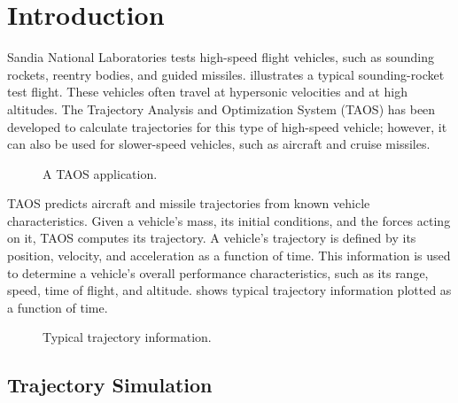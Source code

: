\chapter{Introduction}\label{chap:introduction}

Sandia National Laboratories tests high-speed flight vehicles, such as sounding
rockets, reentry bodies, and guided missiles.  illustrates a
typical sounding-rocket test flight. These vehicles often travel at hypersonic
velocities and at high altitudes. The Trajectory Analysis and Optimization System
(TAOS) has been developed to calculate trajectories for this type of high-speed
vehicle; however, it can also be used for slower-speed vehicles, such as aircraft and
cruise missiles.

\begin{figure}[htbp]
  \centering
  \resizebox{0.86\linewidth}{!}{}
  \caption{A TAOS application.}
  \label{fig:taos-application}
\end{figure}

TAOS predicts aircraft and missile trajectories from known vehicle characteristics.
Given a vehicle's mass, its initial conditions, and the forces acting on it, TAOS
computes its trajectory. A vehicle's trajectory is defined by its position, velocity,
and acceleration as a function of time. This information is used to determine a
vehicle's overall performance characteristics, such as its range, speed, time of
flight, and altitude.  shows typical trajectory
information plotted as a function of time.

\begin{figure}[htbp]
  \centering
  \resizebox{0.96\linewidth}{!}{}
  \caption{Typical trajectory information.}
  \label{fig:typical-trajectory-information}
\end{figure}

\section{Trajectory Simulation}\label{sec:trajectory-simulation}

